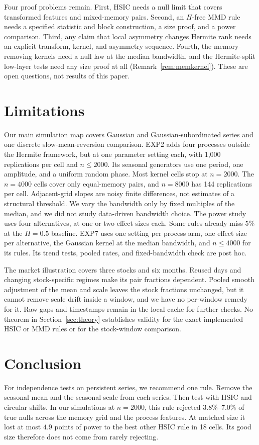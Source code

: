 \documentclass[11pt]{article}
\theoremstyle{remark}
\begin{document}
Four proof problems remain. First, HSIC needs a null limit that covers transformed features and mixed-memory pairs. Second, an $H$-free MMD rule needs a specified statistic and block construction, a size proof, and a power comparison. Third, any claim that local asymmetry changes Hermite rank needs an explicit transform, kernel, and asymmetry sequence. Fourth, the memory-removing kernels need a null law at the median bandwidth, and the Hermite-split low-layer tests need any size proof at all (Remark~\ref{rem:memkernel}). These are open questions, not results of this paper.

\section{Limitations}
Our main simulation map covers Gaussian and Gaussian-subordinated series and one discrete slow-mean-reversion comparison. EXP2 adds four processes outside the Hermite framework, but at one parameter setting each, with 1,000 replications per cell and $n\le2000$. Its seasonal generators use one period, one amplitude, and a uniform random phase. Most kernel cells stop at $n=2000$. The $n=4000$ cells cover only equal-memory pairs, and $n=8000$ has 144 replications per cell. Adjacent-grid slopes are noisy finite differences, not estimates of a structural threshold. We vary the bandwidth only by fixed multiples of the median, and we did not study data-driven bandwidth choice. The power study uses four alternatives, at one or two effect sizes each. Some rules already miss $5\%$ at the $H=0.5$ baseline. EXP7 uses one setting per process arm, one effect size per alternative, the Gaussian kernel at the median bandwidth, and $n\le4000$ for its rules. Its trend tests, pooled rates, and fixed-bandwidth check are post hoc.

The market illustration covers three stocks and six months. Reused days and changing stock-specific regimes make its pair fractions dependent. Pooled smooth adjustment of the mean and scale leaves the stock fractions unchanged, but it cannot remove scale drift inside a window, and we have no per-window remedy for it. Raw gaps and timestamps remain in the local cache for further checks. No theorem in Section~\ref{sec:theory} establishes validity for the exact implemented HSIC or MMD rules or for the stock-window comparison.

\section{Conclusion}
For independence tests on persistent series, we recommend one rule. Remove the seasonal mean and the seasonal scale from each series. Then test with HSIC and circular shifts. In our simulations at $n=2000$, this rule rejected $3.8\%$--$7.0\%$ of true nulls across the memory grid and the process features. At matched size it lost at most $4.9$ points of power to the best other HSIC rule in 18 cells. Its good size therefore does not come from rarely rejecting.
\end{document}
